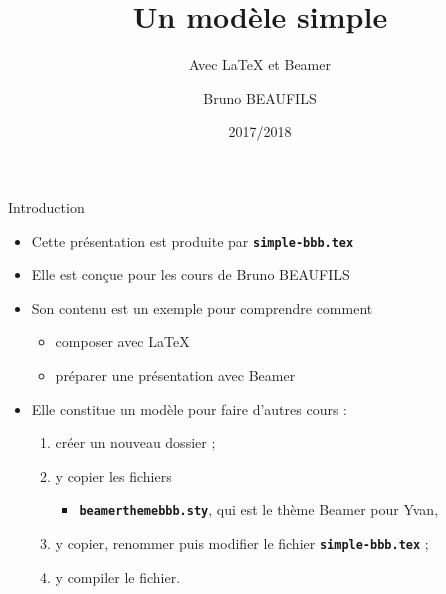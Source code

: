 \documentclass[10pt,t]{beamer}
\title[Cours]{Un modèle simple}
\subtitle{Avec \LaTeX{} et Beamer}
\author{Bruno BEAUFILS}
\institute[]{Université Lille~1 \and IUT «A»}
\date{2017/2018}
\begin{document}
\maketitle


\begin{frame}{Introduction} 

  \begin{itemize}
  \item Cette présentation est produite par \texttt{\textbf{simple-bbb.tex}}
  \item Elle est conçue pour les cours de Bruno BEAUFILS
  \item Son contenu est un exemple pour comprendre comment

    \begin{itemize}
    \item composer avec \LaTeX{}
    \item préparer une présentation avec Beamer
    \end{itemize}

  \end{itemize}

  \pause


  \begin{itemize}
  \item Elle constitue un modèle pour faire d'autres cours :
      
    \begin{enumerate}
    \item créer un nouveau dossier ;
    \item y copier les fichiers 
      
      \begin{itemize}
      \item \texttt{\textbf{beamerthemebbb.sty}}, qui est le thème Beamer pour Yvan,
      \end{itemize}
      
    \item y copier, renommer puis modifier le fichier \texttt{\textbf{simple-bbb.tex}} ;
    \item y compiler le fichier.
    \end{enumerate}
  \end{itemize}
\end{frame}
\end{document}
